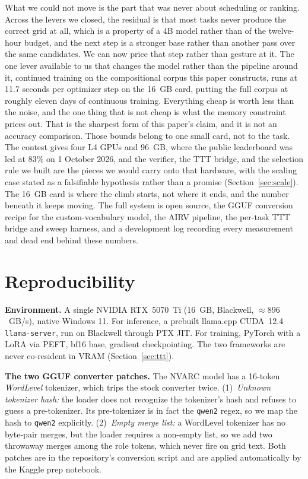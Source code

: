 \documentclass[11pt]{article}
\begin{document}
What we could not move is the part that was never about scheduling or ranking. Across the levers we
closed, the residual is that most tasks never produce the correct grid at all, which is a property of a
4B model rather than of the twelve-hour budget, and the next step is a stronger base rather than
another pass over the same candidates. We can now price that step rather than gesture at it. The one
lever available to us that changes the model rather than the pipeline around it, continued training
on the compositional corpus this paper constructs, runs at 11.7 seconds per optimizer step on the
16~GB card, putting the full corpus at roughly eleven days of continuous training. Everything cheap is
worth less than the noise, and the one thing that is not cheap is what the memory constraint prices
out. That is the sharpest form of this paper's claim, and it is not an accuracy comparison. Those bounds belong to one small card, not to
the task. The contest gives four L4 GPUs and 96~GB, where the public leaderboard was led at 83\% on 1 October 2026, and
the verifier, the TTT bridge, and the selection rule we built are the pieces we would carry onto that
hardware, with the scaling case stated as a falsifiable hypothesis rather than a promise
(Section~\ref{sec:scale}). The 16~GB card is where the climb starts, not where it ends, and the number beneath it keeps moving. The full system is open source, the GGUF conversion recipe for the custom-vocabulary
model, the AIRV pipeline, the per-task TTT bridge and sweep harness, and a development log recording
every measurement and dead end behind these numbers.

\appendix

\section{Reproducibility}
\label{app:repro}

\textbf{Environment.} A single NVIDIA RTX~5070~Ti (16~GB, Blackwell, $\approx 896$~GB/s), native
Windows 11. For inference, a prebuilt llama.cpp CUDA~12.4 \texttt{llama-server}, run on Blackwell through
PTX JIT. For training, PyTorch with a LoRA via PEFT, bf16 base, gradient checkpointing. The two frameworks
are never co-resident in VRAM (Section~\ref{sec:ttt}).

\textbf{The two GGUF converter patches.} The NVARC model has a 16-token \emph{WordLevel} tokenizer,
which trips the stock converter twice. (1)~\emph{Unknown tokenizer hash:} the loader does not
recognize the tokenizer's hash and refuses to guess a pre-tokenizer. Its pre-tokenizer is in fact the
\texttt{qwen2} regex, so we map the hash to \texttt{qwen2} explicitly. (2)~\emph{Empty merge list:} a
WordLevel tokenizer has no byte-pair merges, but the loader requires a non-empty list, so we add two
throwaway merges among the role tokens, which never fire on grid text. Both patches are in the
repository's conversion script and are applied automatically by the Kaggle prep notebook.
\end{document}
